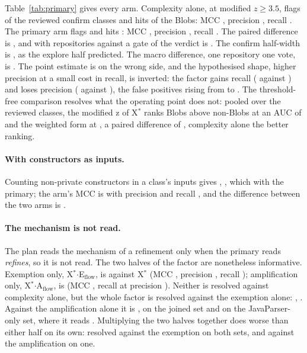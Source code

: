 \documentclass[11pt,a4paper]{article}
\newcommand{\madz}{modified $z \geq 3.5$}
\newcommand{\sig}[1]{\texttt{#1}}
\newcommand{\Xs}{X$^*$}
\newcommand{\Eflow}{E$_{\text{flow}}$}
\newcommand{\Aflow}{A$_{\text{flow}}$}
\begin{document}
Table~\ref{tab:primary} gives every arm. Complexity alone,
\sig{\xClass} at \madz{}, flags \primXFlagged{} of the \primUniv{} reviewed
confirm classes and hits \primXTp{} of the \primPos{} Blobs: MCC
\primXMcc{}, precision \primXPrecision{}, recall \primXRecall{}. The primary
arm flags \primDFlagged{} and hits \primDTp{}: MCC \primDMcc{}, precision
\primDPrecision{}, recall \primDRecall{}. The paired difference is
\textbf{\primMicro{}}, and with \primGateReposWithBlob{} repositories
against a gate of \gateRequired{} the verdict is \textbf{\primVerdict}. The
confirm half-width is \primHalfWidthConfirm{}, as the explore half
predicted. The macro difference, one repository one vote, is
\primMacro{}. The point estimate is on the wrong side, and the
hypothesised shape, higher precision at a small cost in recall, is
inverted: the factor gains recall (\primDRecall{} against \primXRecall{})
and loses precision (\primDPrecision{} against \primXPrecision{}), the
false positives rising from \primXFp{} to \primDFp{}. The threshold-free
comparison resolves what the operating point does not: pooled over the
reviewed classes, the modified z of \Xs{} ranks Blobs above non-Blobs at an
AUC of \primAucX{} and the weighted form at \primAucD{}, a paired difference
of \primAucDiff{}, complexity alone the better ranking.

\paragraph{With constructors as inputs.} Counting non-private constructors
in a class's inputs gives \primCtorMicro{}, \primCtorReading{}, which
\primCtorAgrees{} with the primary; the arm's MCC is \primCtorMcc{} with
precision \primCtorPrecision{} and recall \primCtorRecall{}, and the
difference between the two arms is \primMethodsVsCtorMicro{}.

\paragraph{The mechanism is not read.} The plan reads the mechanism of a
refinement only when the primary reads \emph{refines}, so it is not read.
The two halves of the factor are nonetheless informative. Exemption only,
\Xs$\cdot$\Eflow{}, is \primEMicro{} against \Xs{} (MCC \primEYMcc{},
precision \primEYPrecision{}, recall \primEYRecall{}); amplification only,
\Xs$\cdot$\Aflow{}, is \primAmpMicro{} (MCC \primAmpYMcc{}, recall
\primAmpYRecall{} at precision \primAmpYPrecision{}). Neither is resolved
against complexity alone, but the whole factor is resolved against the
exemption alone: \primDvsEMicro{}, \primDvsEReading{}. Against the
amplification alone it is \primDvsAMicro{}, \primDvsAReading{} on the joined
set and \primJpDvsAMicro{} on the JavaParser-only set, where it reads
\primJpDvsAReading{}. Multiplying the two halves together does worse than
either half on its own: resolved against the exemption on both sets, and
against the amplification on one.
\end{document}
